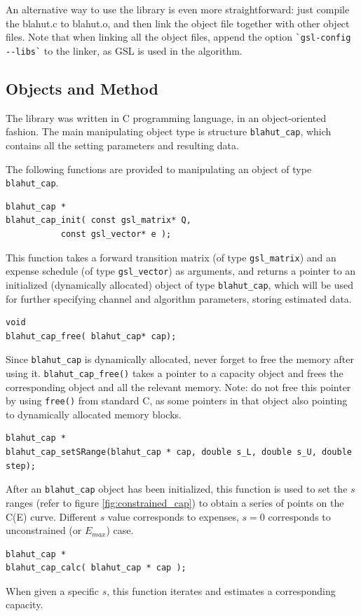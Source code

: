 \documentclass[a4paper,10pt]{article}
\begin{document}
An alternative way to use the library is even more straightforward: just compile the blahut.c to blahut.o, and then link the object file together with other object files. Note that when linking all the object files, append the option \verb|`gsl-config --libs`| to the linker, as GSL is used in the algorithm.

\subsection{Objects and Method}
The library was written in C programming language, in an object-oriented fashion. The main manipulating object type is structure \verb|blahut_cap|, which contains all the setting parameters and resulting data.

The following functions are provided to manipulating an object of type \verb|blahut_cap|.
\begin{verbatim}
blahut_cap * 
blahut_cap_init( const gsl_matrix* Q, 
		   const gsl_vector* e );
\end{verbatim}
This function takes a forward transition matrix (of type \verb|gsl_matrix|) and an expense schedule (of type \verb|gsl_vector|) as arguments, and returns a pointer to an initialized (dynamically allocated) object of type \verb|blahut_cap|, which will be used for further specifying channel and algorithm parameters, storing estimated data.

\begin{verbatim}
void 
blahut_cap_free( blahut_cap* cap);
\end{verbatim}
Since \verb|blahut_cap| is dynamically allocated, never forget to free the memory after using it. \verb|blahut_cap_free()| takes a pointer to a capacity object and frees the corresponding object and all the relevant memory.
Note: do not free this pointer by using \verb|free()| from standard C, as some pointers in that object also pointing to dynamically allocated memory blocks.

\begin{verbatim}
blahut_cap * 
blahut_cap_setSRange(blahut_cap * cap, double s_L, double s_U, double step);
\end{verbatim}
After an \verb|blahut_cap| object has been initialized, this function is used to set the $s$ ranges (refer to figure \ref{fig:constrained_cap}) to obtain a series of points on the C(E) curve. Different $s$ value corresponds to expenses, $s=0$ corresponds to unconstrained (or $E_{max}$) case.

\begin{verbatim}
blahut_cap *
blahut_cap_calc( blahut_cap * cap );
\end{verbatim}
When given a specific $s$, this function iterates and estimates a corresponding capacity.
\end{document}
